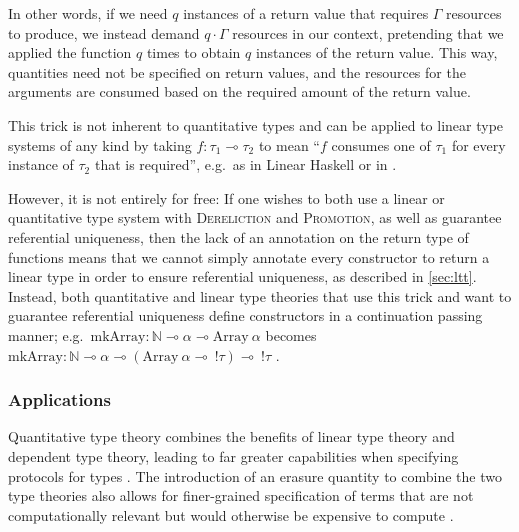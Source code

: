 In other words, if we need $q$ instances of a return value that requires $\Gamma$ resources to produce, we instead demand $q \cdot \Gamma$ resources in our context, pretending that we applied the function $q$ times to obtain $q$ instances of the return value. This way, quantities need not be specified on return values, and the resources for the arguments are consumed based on the required amount of the return value.

This trick is not inherent to quantitative types and can be applied to linear type systems of any kind by taking $f : \tau_1 \multimap \tau_2$ to mean ``$f$ consumes one of $\tau_1$ for every instance of $\tau_2$ that is required'', e.g.\ as in Linear Haskell \citep{bernardy_linear_2018} or in \cite{ghica_bounded_2014}. 

However, it is not entirely for free: If one wishes to both use a linear or quantitative type system with \textsc{Dereliction} and \textsc{Promotion}, as well as guarantee referential uniqueness, then the lack of an annotation on the return type of functions means that we cannot simply annotate every constructor to return a linear type in order to ensure referential uniqueness, as described in \cref{sec:ltt}. 
Instead, both quantitative and linear type theories that use this trick and want to guarantee referential uniqueness define constructors in a continuation passing manner; e.g.\ $\mathrm{mkArray} : \mathbb{N} \multimap \alpha \multimap \mathrm{Array}\ \alpha$ becomes $\mathrm{mkArray} : \mathbb{N} \multimap \alpha \multimap (\mathrm{Array}\ \alpha \multimap\ !\tau) \multimap\ !\tau$ \citep{bernardy_linear_2018}.

\subsubsection{Applications}
Quantitative type theory combines the benefits of linear type theory and dependent type theory, leading to far greater capabilities when specifying protocols for types \citep{brady_idris_2021}. The introduction of an erasure quantity to combine the two type theories also allows for finer-grained specification of terms that are not computationally relevant but would otherwise be expensive to compute \citep{brady_idris_2021}.

